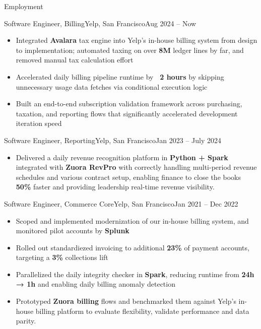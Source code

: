 \documentclass[]{mcdowellcv}
\begin{document}
\begin{cvsection}{Employment}
            \begin{cvsubsection}{Software Engineer, Billing}{Yelp, San Francisco}{Aug 2024 – Now}
                \begin{itemize}
                    \item Integrated \textbf{Avalara} tax engine into Yelp's in-house billing system from design to implementation; automated taxing on over \textbf{8M} ledger lines by far, and removed manual tax calculation effort
                    \item Accelerated daily billing pipeline runtime by \textbf{~2 hours} by skipping unnecessary usage data fetches via conditional execution logic
                    \item Built an end-to-end subscription validation framework across purchasing, taxation, and reporting flows that significantly accelerated development iteration speed
                \end{itemize}
		\end{cvsubsection}

            \begin{cvsubsection}{Software Engineer, Reporting}{Yelp, San Francisco}{Jan 2023 – July 2024}
                \begin{itemize}
                    \item Delivered a daily revenue recognition platform in \textbf{Python + Spark} integrated with \textbf{Zuora RevPro} with correctly handling multi-period revenue schedules and various contract setup, enabling finance to close the books \textbf{50\%} faster and providing leadership real-time revenue visibility.

                \end{itemize}
		\end{cvsubsection}

            \begin{cvsubsection}{Software Engineer, Commerce Core}{Yelp, San Francisco}{Jan 2021 – Dec 2022}
			\begin{itemize}
            \item Scoped and implemented modernization of our in-house billing system, and monitored pilot accounts by \textbf{Splunk}
            \item Rolled out standardiezed invoicing to additional \textbf{23\%} of payment accounts, targeting a \textbf{3\%} collections lift
            \item Parallelized the daily integrity checker in \textbf{Spark}, reducing runtime from \textbf{24h → 1h} and enabling daily billing anomaly detection
            \item Prototyped \textbf{Zuora billing} flows and benchmarked them against Yelp’s in-house billing platform to evaluate flexibility, validate performance and data parity.


\end{itemize}
\end{cvsubsection}
\end{cvsection}
\end{document}
